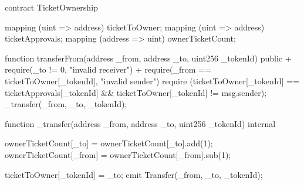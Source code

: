 contract TicketOwnership {
  mapping (uint => address) ticketToOwner;
  mapping (uint => address) ticketApprovals;
  mapping (address => uint) ownerTicketCount;
  
  function transferFrom(address _from, address _to, uint256 _tokenId) public {
+   require(_to != 0, "invalid receiver")
+   require(_from == ticketToOwner[_tokenId], "invalid sender")
    require (ticketToOwner[_tokenId] == ticketApprovals[_tokenId] && ticketToOwner[_tokenId] != msg.sender);
    _transfer(_from, _to, _tokenId);
  }

  function _transfer(address _from, address _to, uint256 _tokenId) internal {
      ownerTicketCount[_to] = ownerTicketCount[_to].add(1);
      ownerTicketCount[_from] = ownerTicketCount[_from].sub(1);

      ticketToOwner[_tokenId] = _to;
      emit Transfer(_from, _to, _tokenId);
  }
}